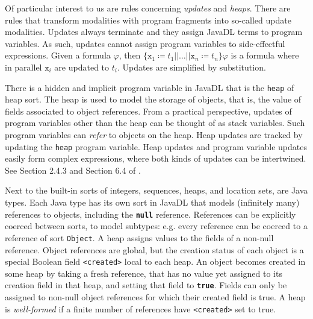 \documentclass[runningheads]{llncs}
\begin{document}
Of particular interest to us are rules concerning \emph{updates} and \emph{heaps}. There are rules that transform modalities with program fragments into so-called update modalities. Updates always terminate and they assign JavaDL terms to program variables. As such, updates cannot assign program variables to side-effectful expressions. Given a formula $\varphi$, then $\{\mathtt{x}_1\coloneqq t_1||\ldots||\mathtt{x}_n\coloneqq t_n\}\varphi$ is a formula where in parallel $\mathtt{x}_i$ are updated to $t_i$. Updates are simplified by substitution.

There is a hidden and implicit program variable in JavaDL that is the \texttt{heap} of heap sort. The heap is used to model the storage of objects, that is, the value of fields associated to object references. From a practical perspective, updates of program variables other than the heap can be thought of as stack variables. Such program variables can \emph{refer} to objects on the heap. Heap updates are tracked by updating the \texttt{heap} program variable. Heap updates and program variable updates easily form complex expressions, where both kinds of updates can be intertwined. See Section 2.4.3 and Section 6.4 of \cite{KeYbook}.

Next to the built-in sorts of integers, sequences, heaps, and location sets, are Java types. Each Java type has its own sort in JavaDL that models (infinitely many) references to objects, including the \texttt{\textbf{null}} reference. References can be explicitly coerced between sorts, to model subtypes: e.g. every reference can be coerced to a reference of sort \texttt{Object}. A heap assigns values to the fields of a non-null reference.
Object references are global, but the creation status of each object is a special Boolean field \texttt{<created>} local to each heap. An object becomes created in some heap by taking a fresh reference, that has no value yet assigned to its creation field in that heap, and setting that field to \texttt{\textbf{true}}. Fields can only be assigned to non-null object references for which their created field is true. A heap is \emph{well-formed} if a finite number of references have \texttt{<created>} set to true.
\end{document}
